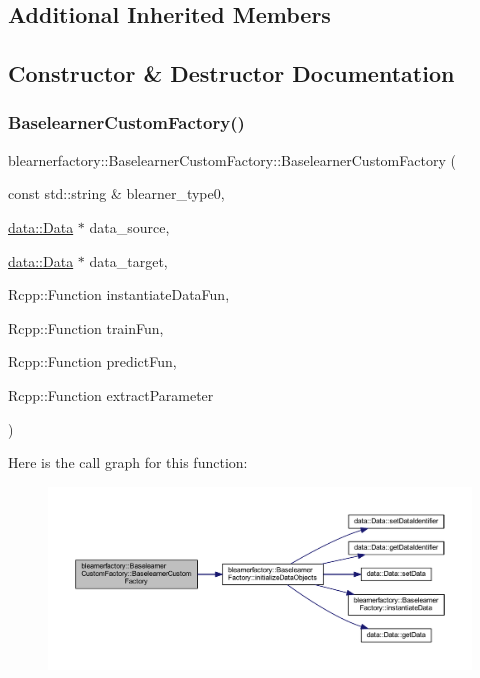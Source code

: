 \subsection*{Additional Inherited Members}


\subsection{Constructor \& Destructor Documentation}
\mbox{\label{classblearnerfactory_1_1_baselearner_custom_factory_a17a9ea35c905f9641f684db8928d3fa8}} 
\subsubsection{\texorpdfstring{Baselearner\+Custom\+Factory()}{BaselearnerCustomFactory()}}
{\footnotesize\ttfamily blearnerfactory\+::\+Baselearner\+Custom\+Factory\+::\+Baselearner\+Custom\+Factory (\begin{DoxyParamCaption}\item[{const std\+::string \&}]{blearner\+\_\+type0,  }\item[{\mbox{\hyperlink{classdata_1_1_data}{data\+::\+Data}} $\ast$}]{data\+\_\+source,  }\item[{\mbox{\hyperlink{classdata_1_1_data}{data\+::\+Data}} $\ast$}]{data\+\_\+target,  }\item[{Rcpp\+::\+Function}]{instantiate\+Data\+Fun,  }\item[{Rcpp\+::\+Function}]{train\+Fun,  }\item[{Rcpp\+::\+Function}]{predict\+Fun,  }\item[{Rcpp\+::\+Function}]{extract\+Parameter }\end{DoxyParamCaption})}

Here is the call graph for this function\+:\nopagebreak
\begin{figure}[H]
\begin{center}
\leavevmode
\includegraphics[width=350pt]{classblearnerfactory_1_1_baselearner_custom_factory_a17a9ea35c905f9641f684db8928d3fa8_cgraph}
\end{center}
\end{figure}


